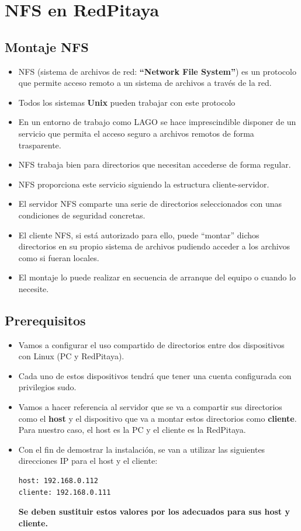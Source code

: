 \documentclass[a4paper,11pt]{article}
\begin{document}
\section{NFS en RedPitaya}
\subsection{Montaje NFS}
\begin{itemize}
  \item NFS (sistema de archivos de red: \textbf{``Network File System''}) es un
        protocolo que permite acceso remoto a un sistema de archivos a
        través de la red.
  \item Todos los sistemas \textbf{Unix} pueden trabajar con este protocolo
  \item En un entorno de trabajo como LAGO se hace imprescindible disponer de
        un servicio que permita el acceso seguro a archivos remotos de forma
        trasparente.
  \item NFS trabaja bien para directorios que necesitan accederse de
        forma regular.
  \item NFS proporciona este servicio siguiendo la estructura
        cliente-servidor.
  \item El servidor NFS comparte una serie de directorios
        seleccionados con unas condiciones de seguridad concretas.
  \item El cliente NFS, si está autorizado para ello, puede ``montar''
        dichos directorios en su propio sistema de archivos pudiendo acceder
        a los archivos como si fueran locales.
  \item El montaje lo puede realizar en secuencia de arranque del equipo o
        cuando lo necesite.
\end{itemize}

\subsection{Prerequisitos}
\begin{itemize}
  \item Vamos a configurar el uso compartido de directorios entre dos
        dispositivos con Linux (PC y RedPitaya).
  \item Cada uno de estos dispositivos tendrá que tener una cuenta
        configurada con privilegios sudo.
  \item Vamos a hacer referencia al servidor que se va a compartir sus
        directorios como el \textbf{host} y el dispositivo que va a montar estos
        directorios como \textbf{cliente}. Para nuestro caso, el host es la PC y
        el cliente es la RedPitaya.
  \item Con el fin de demostrar la instalación, se van a utilizar las
        siguientes direcciones IP para el host y el cliente:
\begin{verbatim}
host: 192.168.0.112 
cliente: 192.168.0.111
\end{verbatim}
        \textbf{Se deben sustituir estos valores por los adecuados para sus
        host y cliente.}
\end{itemize}
\end{document}
